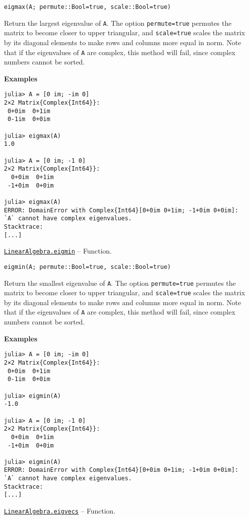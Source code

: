 \begin{adjustwidth}{2em}{0pt}


\begin{verbatim}
eigmax(A; permute::Bool=true, scale::Bool=true)
\end{verbatim}

Return the largest eigenvalue of \texttt{A}. The option \texttt{permute=true} permutes the matrix to become closer to upper triangular, and \texttt{scale=true} scales the matrix by its diagonal elements to make rows and columns more equal in norm. Note that if the eigenvalues of \texttt{A} are complex, this method will fail, since complex numbers cannot be sorted.

\textbf{Examples}


\begin{verbatim}
julia> A = [0 im; -im 0]
2×2 Matrix{Complex{Int64}}:
 0+0im  0+1im
 0-1im  0+0im

julia> eigmax(A)
1.0

julia> A = [0 im; -1 0]
2×2 Matrix{Complex{Int64}}:
  0+0im  0+1im
 -1+0im  0+0im

julia> eigmax(A)
ERROR: DomainError with Complex{Int64}[0+0im 0+1im; -1+0im 0+0im]:
`A` cannot have complex eigenvalues.
Stacktrace:
[...]
\end{verbatim}



\end{adjustwidth}
\hypertarget{658135215942727363}{}
\hyperlink{658135215942727363}{\texttt{LinearAlgebra.eigmin}}  -- {Function.}

\begin{adjustwidth}{2em}{0pt}


\begin{verbatim}
eigmin(A; permute::Bool=true, scale::Bool=true)
\end{verbatim}

Return the smallest eigenvalue of \texttt{A}. The option \texttt{permute=true} permutes the matrix to become closer to upper triangular, and \texttt{scale=true} scales the matrix by its diagonal elements to make rows and columns more equal in norm. Note that if the eigenvalues of \texttt{A} are complex, this method will fail, since complex numbers cannot be sorted.

\textbf{Examples}


\begin{verbatim}
julia> A = [0 im; -im 0]
2×2 Matrix{Complex{Int64}}:
 0+0im  0+1im
 0-1im  0+0im

julia> eigmin(A)
-1.0

julia> A = [0 im; -1 0]
2×2 Matrix{Complex{Int64}}:
  0+0im  0+1im
 -1+0im  0+0im

julia> eigmin(A)
ERROR: DomainError with Complex{Int64}[0+0im 0+1im; -1+0im 0+0im]:
`A` cannot have complex eigenvalues.
Stacktrace:
[...]
\end{verbatim}



\end{adjustwidth}
\hypertarget{8591842276375230542}{}
\hyperlink{8591842276375230542}{\texttt{LinearAlgebra.eigvecs}}  -- {Function.}

